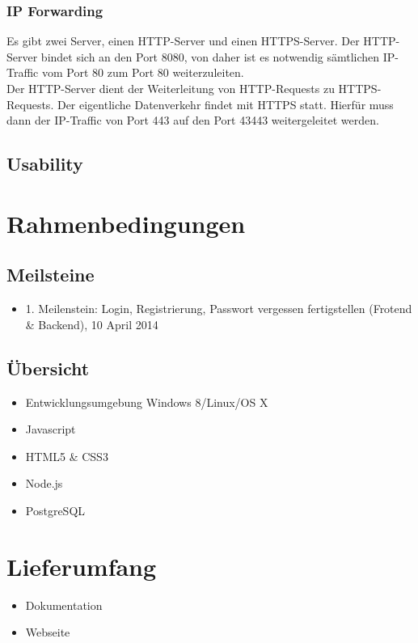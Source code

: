 \documentclass[a4paper,bibtotoc,oneside]{scrartcl}	%
\begin{document}
		\subsubsection{IP Forwarding}
			Es gibt zwei Server, einen HTTP-Server und einen HTTPS-Server. Der HTTP-Server bindet
			sich an den Port 8080, von daher ist es notwendig sämtlichen IP-Traffic vom Port 80
			zum Port 80 weiterzuleiten.\\
			
			\noindent Der HTTP-Server dient der Weiterleitung von HTTP-Requests zu HTTPS-Requests.
			Der eigentliche Datenverkehr findet mit HTTPS statt. Hierfür muss dann der IP-Traffic
			von Port 443 auf den Port 43443 weitergeleitet werden.
	\subsection{Usability}

\section{Rahmenbedingungen}
\subsection{Meilsteine}
	\begin{itemize}
		\item 1. Meilenstein: Login, Registrierung, Passwort vergessen fertigstellen (Frotend \& Backend), 10 April 2014

	\end{itemize}
\subsection{Übersicht}
	\begin{itemize}
		\item Entwicklungsumgebung Windows 8/Linux/OS X
		\item Javascript
		\item HTML5 \& CSS3
		\item Node.js
		\item PostgreSQL
	\end{itemize}

\section{Lieferumfang}
	\begin{itemize}
		\item Dokumentation
		\item Webseite
	\end{itemize}
\newpage
\listoffigures
{}


\end{document}
